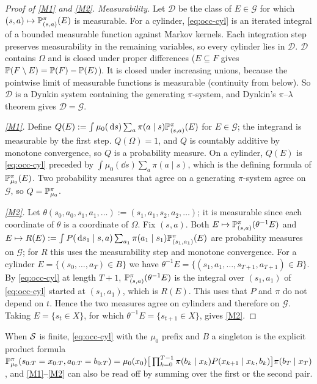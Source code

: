 \begin{proof}[Proof of \ref{M1} and \ref{M2}]
\emph{Measurability.} Let $\mathcal D$ be the class of $E\in\mathcal G$ for which $(s,a)\mapsto\mathbb{P}^\pi_{(s,a)}(E)$ is measurable.
For a cylinder, \eqref{eq:occ-cyl} is an iterated integral of a bounded measurable function against Markov kernels.
Each integration step preserves measurability in the remaining variables, so every cylinder lies in $\mathcal D$.
$\mathcal D$ contains $\Omega$ and is closed under proper differences ($E\subseteq F$ gives $\mathbb{P}(F\setminus E)=\mathbb{P}(F)-\mathbb{P}(E)$).
It is closed under increasing unions, because the pointwise limit of measurable functions is measurable (continuity from below).
So $\mathcal D$ is a Dynkin system containing the generating $\pi$-system, and Dynkin's $\pi$--$\lambda$ theorem gives $\mathcal D=\mathcal G$.

\emph{\ref{M1}.} Define $Q(E):=\int\mu_0(\,\mathrm{d} s)\sum_a\pi(a\mid s)\mathbb{P}^\pi_{(s,a)}(E)$ for $E\in\mathcal G$; the integrand is measurable by the first step.
$Q(\Omega)=1$, and $Q$ is countably additive by monotone convergence, so $Q$ is a probability measure.
On a cylinder, $Q(E)$ is \eqref{eq:occ-cyl} preceded by $\int\mu_0(\dd s)\sum_a\pi(a\mid s)$, which is the defining formula of $\mathbb{P}^\pi_{\mu_0}(E)$.
Two probability measures that agree on a generating $\pi$-system agree on $\mathcal G$, so $Q=\mathbb{P}^\pi_{\mu_0}$.

\emph{\ref{M2}.} Let $\theta(s_0,a_0,s_1,a_1,\dots):=(s_1,a_1,s_2,a_2,\dots)$; it is measurable since each coordinate of $\theta$ is a coordinate of $\Omega$.
Fix $(s,a)$. Both $E\mapsto\mathbb{P}^\pi_{(s,a)}(\theta^{-1}E)$ and $E\mapsto R(E):=\int P(\,\mathrm{d} s_1\mid s,a)\sum_{a_1}\pi(a_1\mid s_1)\mathbb{P}^\pi_{(s_1,a_1)}(E)$ are probability measures on $\mathcal G$; for $R$ this uses the measurability step and monotone convergence.
For a cylinder $E=\{(s_0,\dots,a_T)\in B\}$ we have $\theta^{-1}E=\{(s_1,a_1,\dots,s_{T+1},a_{T+1})\in B\}$.
By \eqref{eq:occ-cyl} at length $T+1$, $\mathbb{P}^\pi_{(s,a)}(\theta^{-1}E)$ is the integral over $(s_1,a_1)$ of \eqref{eq:occ-cyl} started at $(s_1,a_1)$, which is $R(E)$.
This uses that $P$ and $\pi$ do not depend on $t$.
Hence the two measures agree on cylinders and therefore on $\mathcal G$.
Taking $E=\{s_t\in X\}$, for which $\theta^{-1}E=\{s_{t+1}\in X\}$, gives \ref{M2}.
\end{proof}
When $\mathcal{S}$ is finite, \eqref{eq:occ-cyl} with the $\mu_0$ prefix and $B$ a singleton is the explicit product formula
$\mathbb{P}^\pi_{\mu_0}(s_{0:T}=x_{0:T},a_{0:T}=b_{0:T})
 =\mu_0(x_0)\big[\prod_{k=0}^{T-1}\pi(b_k\mid x_k)P(x_{k+1}\mid x_k,b_k)\big]\pi(b_T\mid x_T)$,
and \ref{M1}--\ref{M2} can also be read off by summing over the first or the second pair.

